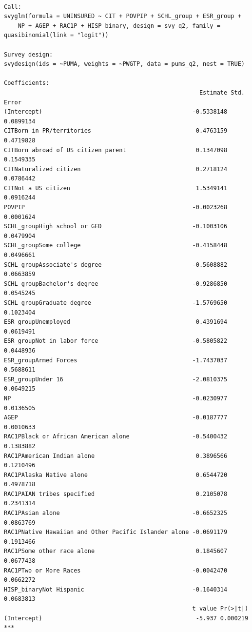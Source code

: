 \documentclass[
  letterpaper,
  DIV=11,
  numbers=noendperiod]{scrartcl}
\begin{document}
\begin{verbatim}

Call:
svyglm(formula = UNINSURED ~ CIT + POVPIP + SCHL_group + ESR_group + 
    NP + AGEP + RAC1P + HISP_binary, design = svy_q2, family = quasibinomial(link = "logit"))

Survey design:
svydesign(ids = ~PUMA, weights = ~PWGTP, data = pums_q2, nest = TRUE)

Coefficients:
                                                        Estimate Std. Error
(Intercept)                                           -0.5338148  0.0899134
CITBorn in PR/territories                              0.4763159  0.4719828
CITBorn abroad of US citizen parent                    0.1347098  0.1549335
CITNaturalized citizen                                 0.2718124  0.0786442
CITNot a US citizen                                    1.5349141  0.0916244
POVPIP                                                -0.0023268  0.0001624
SCHL_groupHigh school or GED                          -0.1003106  0.0479904
SCHL_groupSome college                                -0.4158448  0.0496661
SCHL_groupAssociate's degree                          -0.5608882  0.0663859
SCHL_groupBachelor's degree                           -0.9286850  0.0545245
SCHL_groupGraduate degree                             -1.5769650  0.1023404
ESR_groupUnemployed                                    0.4391694  0.0619491
ESR_groupNot in labor force                           -0.5805822  0.0448936
ESR_groupArmed Forces                                 -1.7437037  0.5688611
ESR_groupUnder 16                                     -2.0810375  0.0649215
NP                                                    -0.0230977  0.0136505
AGEP                                                  -0.0187777  0.0010633
RAC1PBlack or African American alone                  -0.5400432  0.1383882
RAC1PAmerican Indian alone                             0.3896566  0.1210496
RAC1PAlaska Native alone                               0.6544720  0.4978718
RAC1PAIAN tribes specified                             0.2105078  0.2341314
RAC1PAsian alone                                      -0.6652325  0.0863769
RAC1PNative Hawaiian and Other Pacific Islander alone -0.0691179  0.1913466
RAC1PSome other race alone                             0.1845607  0.0677438
RAC1PTwo or More Races                                -0.0042470  0.0662272
HISP_binaryNot Hispanic                               -0.1640314  0.0683813
                                                      t value Pr(>|t|)    
(Intercept)                                            -5.937 0.000219 ***

\end{verbatim}
\end{document}

